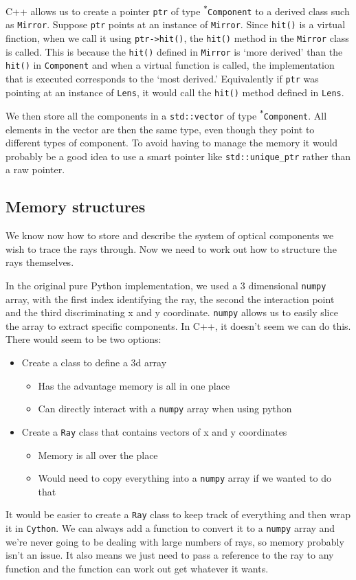 \documentclass{article}
\begin{document}
C++ allows us to create a pointer \texttt{ptr} of type \texttt{\textsuperscript{*}Component} to a derived class such as \texttt{Mirror}. Suppose \texttt{ptr} points at an instance of \texttt{Mirror}. Since \texttt{hit()} is a virtual finction, when we call it using \texttt{ptr->hit()}, the \texttt{hit()} method in the \texttt{Mirror} class is called. This is because the \texttt{hit()} defined in \texttt{Mirror} is `more derived' than the \texttt{hit()} in \texttt{Component} and when a virtual function is called, the implementation that is executed corresponds to the `most derived.' Equivalently if \texttt{ptr} was pointing at an instance of \texttt{Lens}, it would call the \texttt{hit()} method defined in \texttt{Lens}.

We then store all the components in a \texttt{std::vector} of type \texttt{\textsuperscript{*}Component}. All elements in the vector are then the same type, even though they point to different types of component. To avoid having to manage the memory it would probably be a good idea to use a smart pointer like \texttt{std::unique\_ptr} rather than a raw pointer.

\subsection{Memory structures}
We know now how to store and describe the system of optical components we wish to trace the rays through. Now we need to work out how to structure the rays themselves.

In the original pure Python implementation, we used a 3 dimensional \texttt{numpy} array, with the first index identifying the ray, the second the interaction point and the third discriminating x and y coordinate. \texttt{numpy} allows us to easily slice the array to extract specific components. In C++, it doesn't seem we can do this. There would seem to be two options:
\begin{itemize}
    \item Create a class to define a 3d array
    \begin{itemize}
        \item Has the advantage memory is all in one place
        \item Can directly interact with a \texttt{numpy} array when using python
    \end{itemize}
    \item Create a \texttt{Ray} class that contains vectors of x and y coordinates
    \begin{itemize}
        \item Memory is all over the place
        \item Would need to copy everything into a \texttt{numpy} array if we wanted to do that
    \end{itemize}
\end{itemize}
It would be easier to create a \texttt{Ray} class to keep track of everything and then wrap it in \texttt{Cython}. We can always add a function to convert it to a \texttt{numpy} array and we're never going to be dealing with large numbers of rays, so memory probably isn't an issue. It also means we just need to pass a reference to the ray to any function and the function can work out get whatever it wants.
\end{document}
